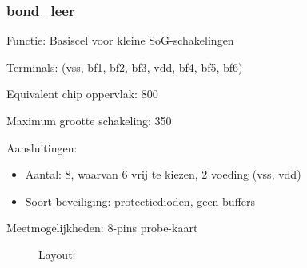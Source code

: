 \subsubsection{bond\_leer}

Functie: Basiscel voor kleine SoG-schakelingen

Terminals: (vss, bf1, bf2, bf3, vdd, bf4, bf5, bf6)

Equivalent chip oppervlak: 800

Maximum grootte schakeling: 350

Aansluitingen: 
\begin{itemize}
\item
Aantal: 8, waarvan 6 vrij te kiezen, 2 voeding (vss, vdd)
\item
Soort beveiliging: protectiedioden, geen buffers
\end{itemize}

Meetmogelijkheden: 8-pins probe-kaart

\begin{figure}[bth]
Layout:\\

\end{figure}

\clearpage

